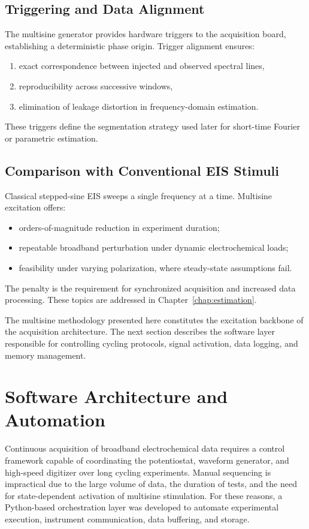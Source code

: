 \subsection{Triggering and Data Alignment}

The multisine generator provides hardware triggers to the acquisition board, establishing a deterministic phase origin. Trigger alignment ensures:
\begin{enumerate}
    \item exact correspondence between injected and observed spectral lines,
    \item reproducibility across successive windows,
    \item elimination of leakage distortion in frequency-domain estimation.
\end{enumerate}
These triggers define the segmentation strategy used later for short-time Fourier or parametric estimation.

\subsection{Comparison with Conventional EIS Stimuli}

Classical stepped-sine EIS sweeps a single frequency at a time. Multisine excitation offers:
\begin{itemize}
    \item orders-of-magnitude reduction in experiment duration;
    \item repeatable broadband perturbation under dynamic electrochemical loads;
    \item feasibility under varying polarization, where steady-state assumptions fail.
\end{itemize}
The penalty is the requirement for synchronized acquisition and increased data processing. These topics are addressed in Chapter~\ref{chap:estimation}.

The multisine methodology presented here constitutes the excitation backbone of the acquisition architecture. The next section describes the software layer responsible for controlling cycling protocols, signal activation, data logging, and memory management.

\section{Software Architecture and Automation}
\label{sec:software}

Continuous acquisition of broadband electrochemical data requires a control framework capable of coordinating the potentiostat, waveform generator, and high-speed digitizer over long cycling experiments. Manual sequencing is impractical due to the large volume of data, the duration of tests, and the need for state-dependent activation of multisine stimulation. For these reasons, a Python-based orchestration layer was developed to automate experimental execution, instrument communication, data buffering, and storage.

